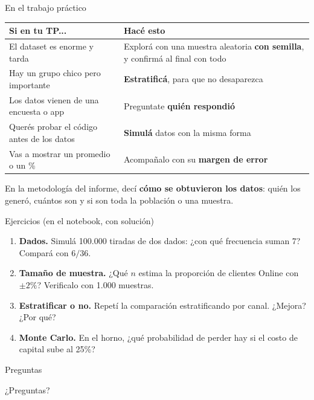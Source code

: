\documentclass[aspectratio=169,10pt]{beamer}
\begin{document}
\begin{frame}{En el trabajo práctico}
\small
\begin{center}
\begin{tabular}{@{}p{5.2cm}p{7.2cm}@{}}
\toprule
\textbf{Si en tu TP...} & \textbf{Hacé esto} \\
\midrule
El dataset es enorme y tarda & Explorá con una muestra aleatoria \textbf{con semilla}, y confirmá al final con todo \\
Hay un grupo chico pero importante & \textbf{Estratificá}, para que no desaparezca \\
Los datos vienen de una encuesta o app & Preguntate \textbf{quién respondió} \\
Querés probar el código antes de los datos & \textbf{Simulá} datos con la misma forma \\
Vas a mostrar un promedio o un \% & Acompañalo con su \textbf{margen de error} \\
\bottomrule
\end{tabular}
\end{center}
\small En la metodología del informe, decí \textbf{cómo se obtuvieron los datos}: quién los generó, cuántos son y si son toda la población o una muestra.
\end{frame}

\begin{frame}{Ejercicios (en el notebook, con solución)}
\begin{enumerate}
  \item \textbf{Dados.} Simulá 100.000 tiradas de dos dados: ¿con qué frecuencia suman 7? Compará con $6/36$.
  \item \textbf{Tamaño de muestra.} ¿Qué $n$ estima la proporción de clientes Online con $\pm 2\%$? Verificalo con 1.000 muestras.
  \item \textbf{Estratificar o no.} Repetí la comparación estratificando por canal. ¿Mejora? ¿Por qué?
  \item \textbf{Monte Carlo.} En el horno, ¿qué probabilidad de perder hay si el costo de capital sube al 25\%?
\end{enumerate}
\end{frame}

\begin{frame}{Preguntas}
\vspace{2cm}
\begin{center}
\Huge ¿Preguntas?
\end{center}
\end{frame}
\end{document}
